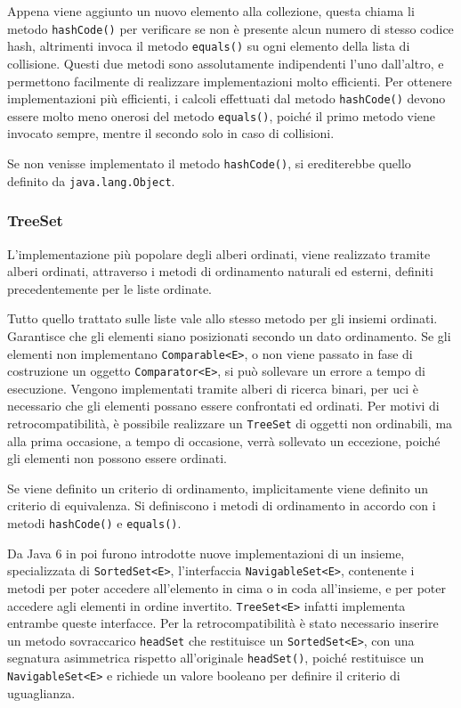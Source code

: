 \documentclass{article}
\numberwithin{equation}{subsection}
\begin{document}
Appena viene aggiunto un nuovo elemento alla collezione, questa chiama li metodo \verb|hashCode()| per verificare se non è presente alcun numero di stesso codice hash, 
altrimenti invoca il metodo \verb|equals()| su ogni elemento della lista di collisione. 
Questi due metodi sono assolutamente indipendenti l'uno dall'altro, e permettono facilmente di realizzare implementazioni molto efficienti. 
Per ottenere implementazioni più efficienti, i calcoli effettuati dal metodo \verb|hashCode()| devono essere molto meno onerosi del metodo \verb|equals()|, poiché il primo 
metodo viene invocato sempre, mentre il secondo solo in caso di collisioni. 

Se non venisse implementato il metodo \verb|hashCode()|, si erediterebbe quello definito da \verb|java.lang.Object|. 


\subsubsection{TreeSet}

L'implementazione più popolare degli alberi ordinati, viene realizzato tramite alberi ordinati, attraverso i metodi di ordinamento naturali ed esterni, definiti precedentemente 
per le liste ordinate. 

Tutto quello trattato sulle liste vale allo stesso metodo per gli insiemi ordinati. 
Garantisce che gli elementi siano posizionati secondo un dato ordinamento. 
Se gli elementi non implementano \verb|Comparable<E>|, o non viene passato in fase di costruzione un oggetto \verb|Comparator<E>|, si può sollevare un errore a tempo di 
esecuzione. 
Vengono implementati tramite alberi di ricerca binari, per uci è necessario che gli elementi possano essere confrontati ed ordinati. Per motivi di retrocompatibilità, 
è possibile realizzare un \verb|TreeSet| di oggetti non ordinabili, ma alla prima occasione, a tempo di occasione, verrà sollevato un eccezione, poiché gli elementi non possono 
essere ordinati. 


Se viene definito un criterio di ordinamento, implicitamente viene definito un criterio di equivalenza. Si definiscono i metodi di ordinamento in accordo con i metodi 
\verb|hashCode()| e \verb|equals()|. 


Da Java 6 in poi furono introdotte nuove implementazioni di un insieme, specializzata di \verb|SortedSet<E>|, l'interfaccia \verb|NavigableSet<E>|, contenente i metodi per poter 
accedere all'elemento in cima o in coda all'insieme, e per poter accedere agli elementi in ordine invertito. 
\verb|TreeSet<E>| infatti implementa entrambe queste interfacce. Per la retrocompatibilità è stato necessario inserire un metodo sovraccarico \verb|headSet| che restituisce 
un \verb|SortedSet<E>|, con una segnatura asimmetrica rispetto all'originale \verb|headSet()|, poiché restituisce un \verb|NavigableSet<E>| e richiede un valore booleano per 
definire il criterio di uguaglianza. 
\end{document}
